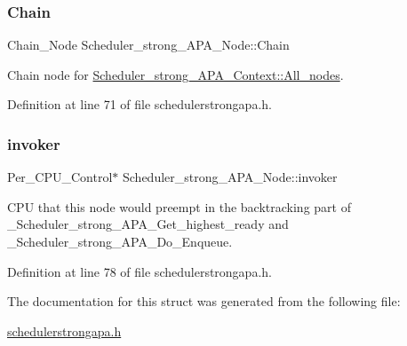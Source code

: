 \mbox{\label{structScheduler__strong__APA__Node_a9008e9546186a6b294f41151bc5a0a38}} 
\subsubsection{\texorpdfstring{Chain}{Chain}}
{\footnotesize\ttfamily Chain\+\_\+\+Node Scheduler\+\_\+strong\+\_\+\+A\+P\+A\+\_\+\+Node\+::\+Chain}



Chain node for \hyperlink{structScheduler__strong__APA__Context_a9bf510496d095d8bca275f35030bb993}{Scheduler\+\_\+strong\+\_\+\+A\+P\+A\+\_\+\+Context\+::\+All\+\_\+nodes}. 



Definition at line 71 of file schedulerstrongapa.\+h.

\mbox{\label{structScheduler__strong__APA__Node_a62a0611c52210e493da7d2f55dfd28ff}} 
\subsubsection{\texorpdfstring{invoker}{invoker}}
{\footnotesize\ttfamily Per\+\_\+\+C\+P\+U\+\_\+\+Control$\ast$ Scheduler\+\_\+strong\+\_\+\+A\+P\+A\+\_\+\+Node\+::invoker}



C\+PU that this node would preempt in the backtracking part of \+\_\+\+Scheduler\+\_\+strong\+\_\+\+A\+P\+A\+\_\+\+Get\+\_\+highest\+\_\+ready and \+\_\+\+Scheduler\+\_\+strong\+\_\+\+A\+P\+A\+\_\+\+Do\+\_\+\+Enqueue. 



Definition at line 78 of file schedulerstrongapa.\+h.



The documentation for this struct was generated from the following file\+:\begin{DoxyCompactItemize}
\item 
\hyperlink{schedulerstrongapa_8h}{schedulerstrongapa.\+h}\end{DoxyCompactItemize}
